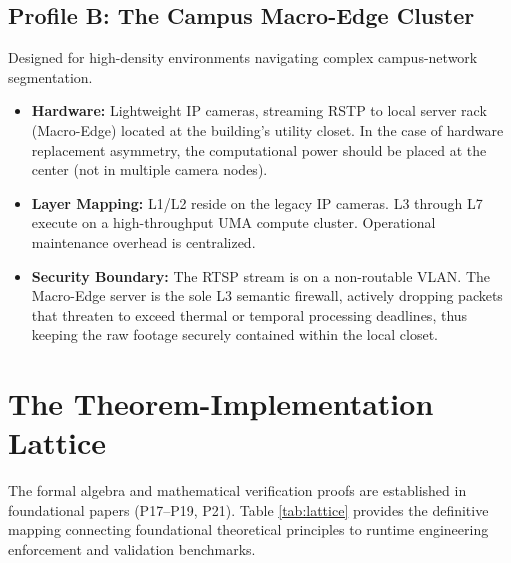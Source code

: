 \documentclass[conference]{IEEEtran}
\begin{document}
\subsection{Profile B: The Campus Macro-Edge Cluster}
Designed for high-density environments navigating complex campus-network segmentation.
\begin{itemize}
    \item \textbf{Hardware:} Lightweight IP cameras, streaming RSTP to local server rack (Macro-Edge) located at the building’s utility closet. In the case of hardware replacement asymmetry, the computational power should be placed at the center (not in multiple camera nodes).
    \item \textbf{Layer Mapping:} L1/L2 reside on the legacy IP cameras. L3 through L7 execute on a high-throughput UMA compute cluster. Operational maintenance overhead is centralized.
    \item \textbf{Security Boundary:} The RTSP stream is on a non-routable VLAN. The Macro-Edge server is the sole L3 semantic firewall, actively dropping packets that threaten to exceed thermal or temporal processing deadlines, thus keeping the raw footage securely contained within the local closet.
\end{itemize}

\section{The Theorem-Implementation Lattice}
The formal algebra and mathematical verification proofs are established in foundational papers (P17--P19, P21). Table \ref{tab:lattice} provides the definitive mapping connecting foundational theoretical principles to runtime engineering enforcement and validation benchmarks.
\end{document}
